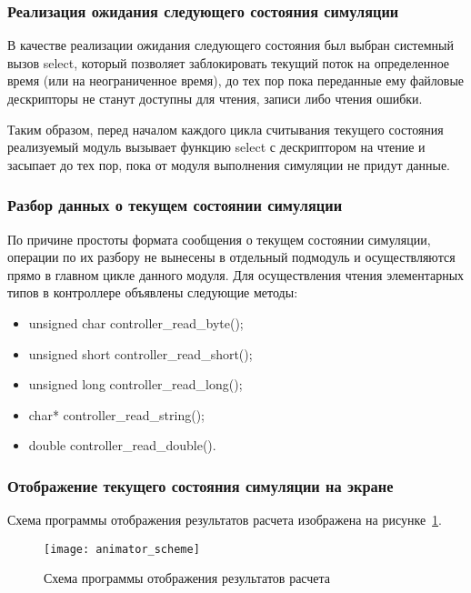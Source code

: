 \subsubsection{Реализация ожидания следующего состояния симуляции}
\label{sec:development:animator:wait}

В качестве реализации ожидания следующего состояния был выбран системный вызов select,
который позволяет заблокировать текущий поток на определенное время (или на неограниченное время),
до тех пор пока переданные ему файловые дескрипторы не станут доступны для чтения, записи либо чтения ошибки.

Таким образом, перед началом каждого цикла считывания текущего состояния реализуемый модуль вызывает функцию select с дескриптором на чтение и засыпает до тех пор,
пока от модуля выполнения симуляции не придут данные.

\subsubsection{Разбор данных о текущем состоянии симуляции}
\label{sec:development:animator:parse}

По причине простоты формата сообщения о текущем состоянии симуляции, операции по их разбору не вынесены в отдельный подмодуль и осуществляются прямо в главном цикле данного модуля.
Для осуществления чтения элементарных типов в контроллере объявлены следующие методы:
\begin{itemize}
  \item unsigned char controller\_read\_byte();
  \item unsigned short controller\_read\_short();
  \item unsigned long controller\_read\_long();
  \item char* controller\_read\_string();
  \item double controller\_read\_double().
\end{itemize}

\subsubsection{Отображение текущего состояния симуляции на экране}
\label{sec:development:animator:show}

Схема программы отображения результатов расчета изображена на рисунке~\ref{sec:development:animator:main_cycle_pic}.

\begin{figure}[!ht]
  \centering
  \texttt{[image: animator\_scheme]}
  \caption{Схема программы отображения результатов расчета}
  \label{sec:development:animator:main_cycle_pic}
\end{figure}


